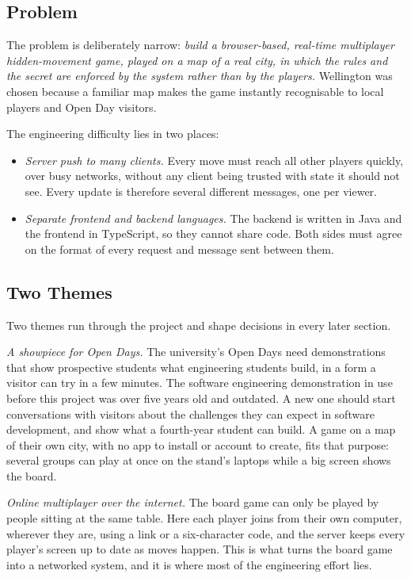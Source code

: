 \documentclass[lettersize,journal]{IEEEtran}
\begin{document}
\subsection{Problem}
The problem is deliberately narrow: \emph{build a browser-based, real-time multiplayer hidden-movement game, played on a map of a real city, in which the rules and the secret are enforced by the system rather than by the players.} Wellington was chosen because a familiar map makes the game instantly recognisable to local players and Open Day visitors.

The engineering difficulty lies in two places:
\begin{itemize}
	\item \emph{Server push to many clients.} Every move must reach all other players quickly, over busy networks, without any client being trusted with state it should not see. Every update is therefore several different messages, one per viewer.
	\item \emph{Separate frontend and backend languages.} The backend is written in Java and the frontend in TypeScript, so they cannot share code. Both sides must agree on the format of every request and message sent between them.
\end{itemize}

\subsection{Two Themes}
Two themes run through the project and shape decisions in every later section.

\emph{A showpiece for Open Days.} The university's Open Days need demonstrations that show prospective students what engineering students build, in a form a visitor can try in a few minutes. The software engineering demonstration in use before this project was over five years old and outdated. A new one should start conversations with visitors about the challenges they can expect in software development, and show what a fourth-year student can build. A game on a map of their own city, with no app to install or account to create, fits that purpose: several groups can play at once on the stand's laptops while a big screen shows the board.

\emph{Online multiplayer over the internet.} The board game can only be played by people sitting at the same table. Here each player joins from their own computer, wherever they are, using a link or a six-character code, and the server keeps every player's screen up to date as moves happen. This is what turns the board game into a networked system, and it is where most of the engineering effort lies.
\end{document}
